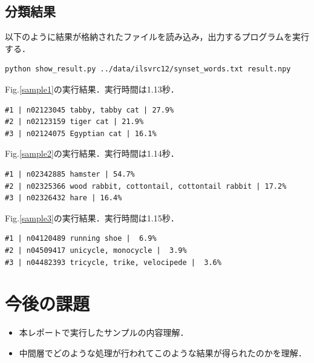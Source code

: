 \documentclass[a4paper,10pt]{jsarticle}
\begin{document}

\subsection{分類結果}
以下のように結果が格納されたファイルを読み込み，出力するプログラムを実行する．
\begin{lstlisting}[basicstyle=\ttfamily\footnotesize, frame=single]
python show_result.py ../data/ilsvrc12/synset_words.txt result.npy
\end{lstlisting}
Fig.\ref{sample1}の実行結果．実行時間は1.13秒．
\begin{lstlisting}[basicstyle=\ttfamily\footnotesize, frame=single]
#1 | n02123045 tabby, tabby cat | 27.9%
#2 | n02123159 tiger cat | 21.9%
#3 | n02124075 Egyptian cat | 16.1%
\end{lstlisting}
Fig.\ref{sample2}の実行結果．実行時間は1.14秒．
\begin{lstlisting}[basicstyle=\ttfamily\footnotesize, frame=single]
#1 | n02342885 hamster | 54.7%
#2 | n02325366 wood rabbit, cottontail, cottontail rabbit | 17.2%
#3 | n02326432 hare | 16.4%
\end{lstlisting}
Fig.\ref{sample3}の実行結果．実行時間は1.15秒．
\begin{lstlisting}[basicstyle=\ttfamily\footnotesize, frame=single]
#1 | n04120489 running shoe |  6.9%
#2 | n04509417 unicycle, monocycle |  3.9%
#3 | n04482393 tricycle, trike, velocipede |  3.6%
\end{lstlisting}




\section{今後の課題}
\begin{itemize}
 \item 本レポートで実行したサンプルの内容理解．
 \item 中間層でどのような処理が行われてこのような結果が得られたのかを理解．
\end{itemize}
\end{document}
